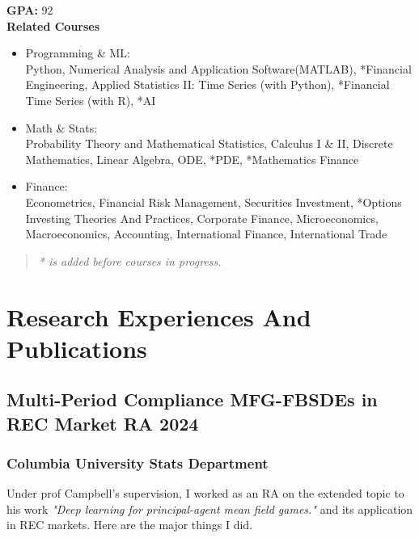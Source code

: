 \documentclass[a4paper]{article}
\begin{document}
\textbf{GPA:} 92\\
\textbf{Related Courses}
\begin{itemize}
    \item[\checkmark] Programming \& ML: \\
    \quad Python, Numerical Analysis and Application Software(MATLAB), *Financial Engineering, Applied Statistics II: Time Series (with Python), *\hypertarget{FinTS}{Financial Time Series} (with R), *AI
    \item[\checkmark] Math \& Stats: \\
    \quad Probability Theory and Mathematical Statistics, Calculus I \& II, Discrete Mathematics, Linear Algebra, ODE, *PDE, *Mathematics Finance
    \item[\checkmark] Finance:\\
    \quad Econometrics, Financial Risk Management, Securities Investment, *Options Investing Theories And Practices, Corporate Finance, Microeconomics, Macroeconomics, Accounting, International Finance, International Trade
\end{itemize}
\begin{quote}
    \itshape
    * is added before courses in progress.
\end{quote}

\section{Research Experiences And Publications}  %

\hypertarget{FBSDEs}{
    \subsection{Multi-Period Compliance MFG-FBSDEs in REC Market \normalfont \hfill RA \hfill 2024}}
    
\subsubsection{Columbia University Stats Department}
\vspace{3pt}
\begin{adjustwidth}{10pt}{}
    Under prof Campbell's supervision, I worked as an RA on the extended topic to his work \textit{"Deep learning for principal-agent mean field
games."} \cite{SC} and its application in REC markets. Here are the major things I did.
\end{adjustwidth}
\end{document}
